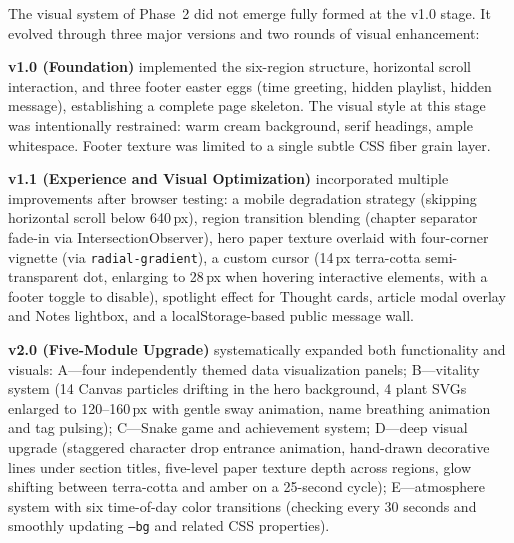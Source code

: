 The visual system of Phase~2 did not emerge fully formed at the v1.0 stage. It evolved through three major versions and two rounds of visual enhancement:

\textbf{v1.0 (Foundation)} implemented the six-region structure, horizontal scroll interaction, and three footer easter eggs (time greeting, hidden playlist, hidden message), establishing a complete page skeleton. The visual style at this stage was intentionally restrained: warm cream background, serif headings, ample whitespace. Footer texture was limited to a single subtle CSS fiber grain layer.

\textbf{v1.1 (Experience and Visual Optimization)} incorporated multiple improvements after browser testing: a mobile degradation strategy (skipping horizontal scroll below 640\,px), region transition blending (chapter separator fade-in via IntersectionObserver), hero paper texture overlaid with four-corner vignette (via \texttt{radial-gradient}), a custom cursor (14\,px terra-cotta semi-transparent dot, enlarging to 28\,px when hovering interactive elements, with a footer toggle to disable), spotlight effect for Thought cards, article modal overlay and Notes lightbox, and a localStorage-based public message wall.

\textbf{v2.0 (Five-Module Upgrade)} systematically expanded both functionality and visuals: A---four independently themed data visualization panels; B---vitality system (14 Canvas particles drifting in the hero background, 4 plant SVGs enlarged to 120--160\,px with gentle sway animation, name breathing animation and tag pulsing); C---Snake game and achievement system; D---deep visual upgrade (staggered character drop entrance animation, hand-drawn decorative lines under section titles, five-level paper texture depth across regions, glow shifting between terra-cotta and amber on a 25-second cycle); E---atmosphere system with six time-of-day color transitions (checking every 30 seconds and smoothly updating \texttt{--bg} and related CSS properties).

